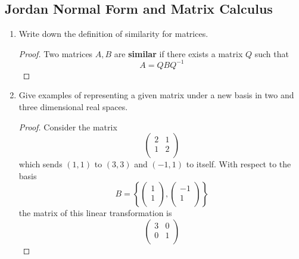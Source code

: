 \documentclass[../psets.tex]{subfiles}
\begin{document}
\subsection*{Jordan Normal Form and Matrix Calculus}
\begin{enumerate}
    \item Write down the definition of similarity for matrices.
    \begin{proof}
        Two matrices $A,B$ are \textbf{similar} if there exists a matrix $Q$ such that
        \begin{equation*}
            A = QBQ^{-1}
        \end{equation*}
    \end{proof}
    \item Give examples of representing a given matrix under a new basis in two and three dimensional real spaces.
    \begin{proof}
        Consider the matrix
        \begin{equation*}
            \begin{pmatrix}
                2 & 1\\
                1 & 2\\
            \end{pmatrix}
        \end{equation*}
        which sends $(1,1)$ to $(3,3)$ and $(-1,1)$ to itself. With respect to the basis
        \begin{equation*}
            B = \left\{
                \begin{pmatrix}
                    1\\
                    1\\
                \end{pmatrix},
                \begin{pmatrix}
                    -1\\
                    1\\
                \end{pmatrix}
            \right\}
        \end{equation*}
        the matrix of this linear transformation is
        \begin{equation*}
            \begin{pmatrix}
                3 & 0\\
                0 & 1\\
            \end{pmatrix}
        \end{equation*}

\end{proof}
\end{enumerate}
\end{document}
